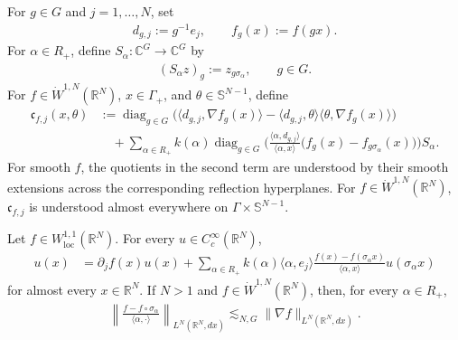 \documentclass{amsart}
\begin{document}
\begin{definition}
For \(g\in G\) and \(j=1,\ldots,N\), set
\begin{align*}
d_{g,j}:=g^{-1}e_j,
\qquad
f_g(x):=f(gx).
\end{align*}
For \(\alpha\in R_+\), define \(S_\alpha:\mathbb C^G\to\mathbb C^G\) by
\begin{align*}
(S_\alpha z)_g:=z_{g\sigma_\alpha},
\qquad g\in G.
\end{align*}
For \(f\in\dot W^{1,N}(\mathbb R^N)\), \(x\in\Gamma_+\), and
\(\theta\in\mathbb S^{N-1}\), define
\begin{align*}
\mathfrak c_{f,j}(x,\theta)
&:=
\operatorname{diag}_{g\in G}
\bigg(
\langle d_{g,j},\nabla f_g(x)\rangle
-
\langle d_{g,j},\theta\rangle
\langle\theta,\nabla f_g(x)\rangle
\bigg)\\
&\quad+
\sum_{\alpha\in R_+}
k(\alpha)
\operatorname{diag}_{g\in G}
\bigg(
\frac{\langle\alpha,d_{g,j}\rangle}
{\langle\alpha,x\rangle}
\big(
f_g(x)-f_{g\sigma_\alpha}(x)
\big)
\bigg)
S_\alpha.
\end{align*}
For smooth \(f\), the quotients in the second term are understood by their smooth extensions across the corresponding reflection hyperplanes. For \(f\in\dot W^{1,N}(\mathbb R^N)\), \(\mathfrak c_{f,j}\) is understood almost everywhere on \(\Gamma\times\mathbb S^{N-1}\).
\end{definition}

\begin{lemma}\label{lem:Dunkl-T-commutator-exact}
Let \(f\in W_{\mathrm{loc}}^{1,1}(\mathbb R^N)\). For every \(u\in C_c^\infty(\mathbb R^N)\),
\begin{align}
[T_{e_j},M_f]u(x)
&=
\partial_j f(x)u(x)
+
\sum_{\alpha\in R_+}
k(\alpha)\langle\alpha,e_j\rangle
\frac{f(x)-f(\sigma_\alpha x)}
{\langle\alpha,x\rangle}
u(\sigma_\alpha x)
\label{eq:Dunkl-T-commutator-exact}
\end{align}
for almost every \(x\in\mathbb R^N\). If \(N>1\) and \(f\in\dot W^{1,N}(\mathbb R^N)\), then, for every \(\alpha\in R_+\),
\begin{align}
\left\|
\frac{f-f\circ\sigma_\alpha}
{\langle\alpha,\cdot\rangle}
\right\|_{L^N(\mathbb R^N,dx)}
\lesssim_{N,G}
\|\nabla f\|_{L^N(\mathbb R^N,dx)}.
\label{eq:Dunkl-reflection-difference-quotient}
\end{align}
\end{lemma}
\end{document}
